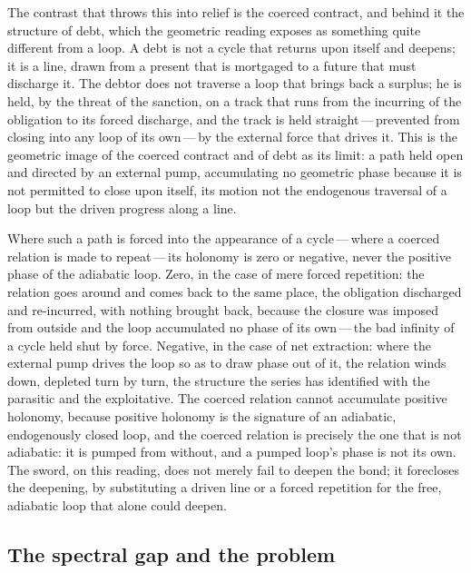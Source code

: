 The contrast that throws this into relief is the coerced contract, and behind it the structure of debt, which the geometric reading exposes as something quite different from a loop. A debt is not a cycle that returns upon itself and deepens; it is a line, drawn from a present that is mortgaged to a future that must discharge it. The debtor does not traverse a loop that brings back a surplus; he is held, by the threat of the sanction, on a track that runs from the incurring of the obligation to its forced discharge, and the track is held straight\,---\,prevented from closing into any loop of its own\,---\,by the external force that drives it. This is the geometric image of the coerced contract and of debt as its limit: a path held open and directed by an external pump, accumulating no geometric phase because it is not permitted to close upon itself, its motion not the endogenous traversal of a loop but the driven progress along a line.

Where such a path is forced into the appearance of a cycle\,---\,where a coerced relation is made to repeat\,---\,its holonomy is zero or negative, never the positive phase of the adiabatic loop. Zero, in the case of mere forced repetition: the relation goes around and comes back to the same place, the obligation discharged and re-incurred, with nothing brought back, because the closure was imposed from outside and the loop accumulated no phase of its own\,---\,the bad infinity of a cycle held shut by force. Negative, in the case of net extraction: where the external pump drives the loop so as to draw phase out of it, the relation winds down, depleted turn by turn, the structure the series has identified with the parasitic and the exploitative. The coerced relation cannot accumulate positive holonomy, because positive holonomy is the signature of an adiabatic, endogenously closed loop, and the coerced relation is precisely the one that is not adiabatic: it is pumped from without, and a pumped loop's phase is not its own. The sword, on this reading, does not merely fail to deepen the bond; it forecloses the deepening, by substituting a driven line or a forced repetition for the free, adiabatic loop that alone could deepen.

\subsection{The spectral gap and the  problem}
\label{p13:sub:holo-amai}

